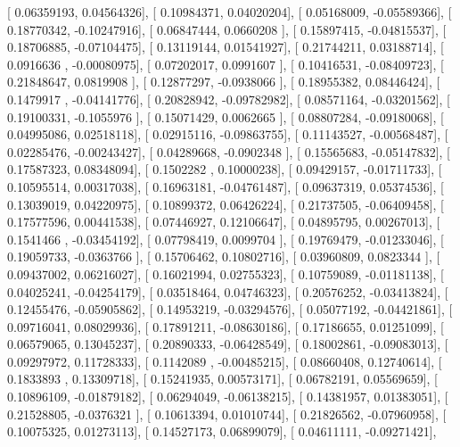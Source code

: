 \documentclass{article}
\begin{document}
       [ 0.06359193,  0.04564326],
       [ 0.10984371,  0.04020204],
       [ 0.05168009, -0.05589366],
       [ 0.18770342, -0.10247916],
       [ 0.06847444,  0.0660208 ],
       [ 0.15897415, -0.04815537],
       [ 0.18706885, -0.07104475],
       [ 0.13119144,  0.01541927],
       [ 0.21744211,  0.03188714],
       [ 0.0916636 , -0.00080975],
       [ 0.07202017,  0.0991607 ],
       [ 0.10416531, -0.08409723],
       [ 0.21848647,  0.0819908 ],
       [ 0.12877297, -0.0938066 ],
       [ 0.18955382,  0.08446424],
       [ 0.1479917 , -0.04141776],
       [ 0.20828942, -0.09782982],
       [ 0.08571164, -0.03201562],
       [ 0.19100331, -0.1055976 ],
       [ 0.15071429,  0.0062665 ],
       [ 0.08807284, -0.09180068],
       [ 0.04995086,  0.02518118],
       [ 0.02915116, -0.09863755],
       [ 0.11143527, -0.00568487],
       [ 0.02285476, -0.00243427],
       [ 0.04289668, -0.0902348 ],
       [ 0.15565683, -0.05147832],
       [ 0.17587323,  0.08348094],
       [ 0.1502282 ,  0.10000238],
       [ 0.09429157, -0.01711733],
       [ 0.10595514,  0.00317038],
       [ 0.16963181, -0.04761487],
       [ 0.09637319,  0.05374536],
       [ 0.13039019,  0.04220975],
       [ 0.10899372,  0.06426224],
       [ 0.21737505, -0.06409458],
       [ 0.17577596,  0.00441538],
       [ 0.07446927,  0.12106647],
       [ 0.04895795,  0.00267013],
       [ 0.1541466 , -0.03454192],
       [ 0.07798419,  0.0099704 ],
       [ 0.19769479, -0.01233046],
       [ 0.19059733, -0.0363766 ],
       [ 0.15706462,  0.10802716],
       [ 0.03960809,  0.0823344 ],
       [ 0.09437002,  0.06216027],
       [ 0.16021994,  0.02755323],
       [ 0.10759089, -0.01181138],
       [ 0.04025241, -0.04254179],
       [ 0.03518464,  0.04746323],
       [ 0.20576252, -0.03413824],
       [ 0.12455476, -0.05905862],
       [ 0.14953219, -0.03294576],
       [ 0.05077192, -0.04421861],
       [ 0.09716041,  0.08029936],
       [ 0.17891211, -0.08630186],
       [ 0.17186655,  0.01251099],
       [ 0.06579065,  0.13045237],
       [ 0.20890333, -0.06428549],
       [ 0.18002861, -0.09083013],
       [ 0.09297972,  0.11728333],
       [ 0.1142089 , -0.00485215],
       [ 0.08660408,  0.12740614],
       [ 0.1833893 ,  0.13309718],
       [ 0.15241935,  0.00573171],
       [ 0.06782191,  0.05569659],
       [ 0.10896109, -0.01879182],
       [ 0.06294049, -0.06138215],
       [ 0.14381957,  0.01383051],
       [ 0.21528805, -0.0376321 ],
       [ 0.10613394,  0.01010744],
       [ 0.21826562, -0.07960958],
       [ 0.10075325,  0.01273113],
       [ 0.14527173,  0.06899079],
       [ 0.04611111, -0.09271421],
\end{document}

